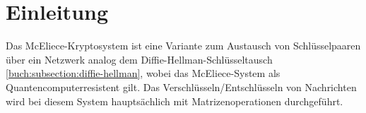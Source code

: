 %
%
%
\section{Einleitung
\label{mceliece:section:einleitung}}
Das McEliece-Kryptosystem ist eine Variante zum Austausch
von Schlüsselpaaren über ein Netzwerk analog dem Diffie-Hellman-Schlüsseltausch \ref{buch:subsection:diffie-hellman},
wobei das McEliece-System als Quantencomputerresistent gilt.
Das Verschlüsseln/Entschlüsseln von Nachrichten wird bei diesem System hauptsächlich mit Matrizenoperationen durchgeführt.


